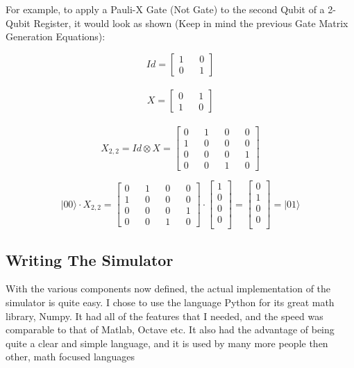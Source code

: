 \documentclass[../main.tex]{subfiles}
\begin{document}
For example, to apply a Pauli-X Gate (Not Gate) to the second Qubit of a 2-Qubit Register, it would look as shown (Keep in mind the previous Gate Matrix Generation Equations):

$$
	Id = \left [\begin{matrix}
		1 && 0 \\
		0 && 1
	\end{matrix}\right]
$$
	\\
$$
	X = \left [\begin{matrix}
		0 && 1 \\
		1 && 0
	\end{matrix}\right]
$$
	\\
$$	
	X_{2,2} = Id \otimes X = \left [\begin{matrix}
		0 && 1 && 0 && 0 \\
		1 && 0 && 0 && 0 \\
		0 && 0 && 0 && 1 \\
		0 && 0 && 1 && 0
	\end{matrix}\right]
$$	

$$
\lvert00\rangle \cdot X_{2,2} = \left[\begin{matrix}
		0 && 1 && 0 && 0 \\
		1 && 0 && 0 && 0 \\
		0 && 0 && 0 && 1 \\
		0 && 0 && 1 && 0
\end{matrix}\right] \cdot \left[\begin{matrix}
	1 \\
	0 \\
	0 \\
	0 \\
\end{matrix}\right] = \left[\begin{matrix}
	0 \\
	1 \\
	0 \\
	0 \\
\end{matrix}\right] = \lvert01\rangle
$$
		
\subsection{Writing The Simulator}
With the various components now defined, the actual implementation of the simulator is quite easy.
I chose to use the language Python for its great math library, Numpy. It had all of the features that I needed, and the speed was comparable to that of Matlab, Octave etc.
It also had the advantage of being quite a clear and simple language, and it is used by many more people then other, math focused languages
\end{document}
